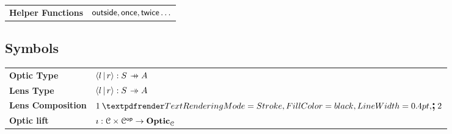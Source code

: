 \documentclass{article}
\begin{document}
\begin{tabular}{ll}
  \textbf{Helper Functions} & $\textsf{outside}, \textsf{once}, \textsf{twice} \ldots$ \\
\end{tabular}

\subsection{Symbols}

\begin{tabular}{ll}
  \textbf{Optic Type} & $\optpair{l}{r}: S \optto A$ \\
  \textbf{Lens Type} & $\optpair{l}{r}: S \lensto A$ \\
  \textbf{Lens Composition} & $1 \optcomp 2$ \\
  \textbf{Optic lift} & $\imath : \EuScript{C} \times {\ensuremath{\EuScript{C}}}^{\mathsf{op}} \to \textbf{Optic}_{\EuScript{C}}$
\end{tabular}
\end{document}
